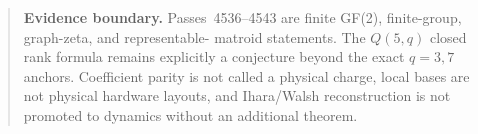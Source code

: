 \begin{quote}\small
\textbf{Evidence boundary.}
Passes~4536--4543 are finite GF(2), finite-group, graph-zeta, and representable-
matroid statements.  The $Q(5,q)$ closed rank formula remains explicitly a
conjecture beyond the exact $q=3,7$ anchors.  Coefficient parity is not called a
physical charge, local bases are not physical hardware layouts, and Ihara/Walsh
reconstruction is not promoted to dynamics without an additional theorem.
\end{quote}

%

%
